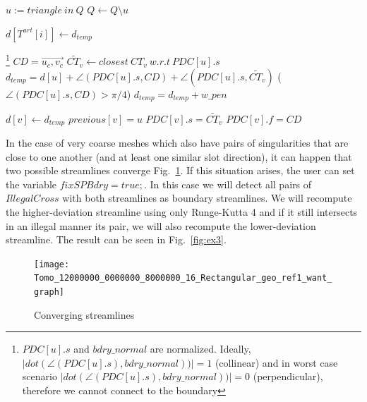 \documentclass[a4paper]{report}
\begin{document}
{{\begin{algorithmic}[2]
		
		\State $u:= triangle\ in\ Q$
		\State $Q\gets Q\setminus u$
			
		\EndIf
		\State $d[T^{art}[i]]\gets d_{temp}$		
		\EndIf
		\EndIf
		
		\footnote{$PDC[u].s$ and $bdry\_normal$ are normalized. Ideally, $|dot(\angle(PDC[u].s), bdry\_normal))| = 1$ (collinear) and in worst case scenario $|dot(\angle(PDC[u].s), bdry\_normal))| = 0$  (perpendicular), therefore we cannot connect to the boundary}
		\EndIf
		\EndIf
		\State $CD = \overrightarrow{u_c, v_c}$
		\State $\widetilde{CT_v}\gets closest\ {CT_v}\ w.r.t\ PDC[u].s$
		\State $d_{temp} = d[u]+\angle(PDC[u].s,CD) + \angle(PDC[u].s,\widetilde{CT_v}) $
		\If($\angle(PDC[u].s,CD)>\pi/4$)
		\State $d_{temp} = d_{temp} + w\_{pen}$
		\EndIf
		
		\State $d[v]\gets d_{temp}$
		\State $previous[v] = u$
		\State $PDC[v].s = \widetilde{CT_v}$
		\State $PDC[v].f = CD$
		\EndIf
		\EndFor
		\EndWhile
		\end{algorithmic}
		
		
		\newpage
		
		
		In the case of very coarse meshes which also have pairs of singularities that are close to one another (and at least one similar slot direction), it can happen that two possible streamlines converge Fig.~\ref{fig:ex2}.	
		If this situation arises, the user can set the variable \textcolor{myGreen}{$fixSPBdry = true;$}. In this case we will detect all pairs of \textcolor{myGreen}{$IllegalCross$} with both streamlines as boundary streamlines. We will recompute the higher-deviation streamline using only Runge-Kutta 4 and if it still intersects in an illegal manner its pair, we will also recompute the lower-deviation streamline. The result can be seen in Fig.~\ref{fig:ex3}.

\begin{figure}[h]
\texttt{[image: Tomo\_12000000\_0000000\_8000000\_16\_Rectangular\_geo\_ref1\_want\_graph]}
\caption{Converging streamlines}
\label{fig:ex2}
\end{figure}

}}
\end{document}
